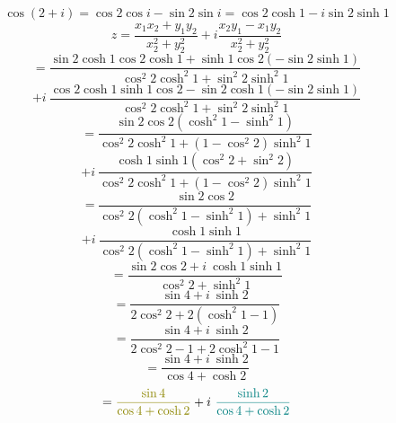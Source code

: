 \documentclass[14pt]{extarticle}
\begin{document}
\begin{displaymath}
    \cos(2+i) = \cos2\cos i - \sin2 \sin i = 
    \cos 2 \cosh 1 - i \sin2 \sinh 1
\end{displaymath}
\begin{displaymath}
    z= \frac{x_1x_2+y_1y_2}{x_2^2+y_2^2} + i \frac{x_2y_1-x_1y_2}{x_2^2+y_2^2}
\end{displaymath}
\begin{displaymath}
    = \frac{\sin 2 \cosh 1 \cos 2 \cosh 1 + \sinh 1 \cos 2 (-\sin2 \sinh 1)}
    {\cos^2 2 \cosh^2 1 + \sin^2 2 \sinh^2 1}
\end{displaymath}
\begin{displaymath}
    + i \ \frac{\cos 2 \cosh 1 \sinh 1 \cos 2 - \sin 2 \cosh 1 (-\sin2 \sinh 1)}
    {\cos^2 2 \cosh^2 1 + \sin^2 2 \sinh^2 1}
\end{displaymath}
\begin{displaymath}
    = \frac{\sin 2 \cos 2 (\cosh^2 1 - \sinh^2 1)}
    {\cos^2 2 \cosh^2 1 + (1 - \cos^2 2) \sinh^2 1}
\end{displaymath}
\begin{displaymath}
    + i \ \frac{\cosh 1 \sinh 1(\cos^2 2 + \sin^2 2)}
    {\cos^2 2 \cosh^2 1 + (1 - \cos^2 2) \sinh^2 1}
\end{displaymath}
\begin{displaymath}
    = \frac{\sin 2 \cos 2}
    {\cos^2 2 (\cosh^2 1 - \sinh^2 1)+\sinh^2 1}
\end{displaymath}
\begin{displaymath}
    + i \ \frac{\cosh 1 \sinh 1}
    {\cos^2 2 (\cosh^2 1 - \sinh^2 1)+\sinh^2 1}
\end{displaymath}
\begin{displaymath}
    = \frac{\sin 2 \cos 2 + i \ \cosh 1 \sinh 1}
    {\cos^2 2 +\sinh^2 1}
\end{displaymath}
\begin{displaymath}
    = \frac{\sin 4 + i \ \sinh 2}
    {2\cos^2 2 +2(\cosh^2 1-1)}
\end{displaymath}
\begin{displaymath}
    = \frac{\sin 4 + i \ \sinh 2}
    {2\cos^2 2 -1 +2\cosh^2 1-1}
\end{displaymath}
\begin{displaymath}
    = \frac{\sin 4 + i \ \sinh 2}
    {\cos4 + \cosh 2}
\end{displaymath}
\begin{displaymath}
    = \textcolor{olive}{\frac{\sin 4}{\cos4 + \cosh 2}}
    +i \ \textcolor{teal}{\frac{ \sinh 2}{\cos4 + \cosh 2}}
\end{displaymath}
\end{document}
